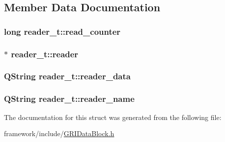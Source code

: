 \subsection{\-Member \-Data \-Documentation}
\hypertarget{structreader__t_a8c3485927676e8777fa189468d4e4744}{
\subsubsection[{read\-\_\-counter}]{\setlength{\rightskip}{0pt plus 5cm}long {\bf reader\-\_\-t\-::read\-\_\-counter}}}\label{structreader__t_a8c3485927676e8777fa189468d4e4744}
\hypertarget{structreader__t_aa62b3e0e8c6abef0b0b397abbe073192}{
\subsubsection[{reader}]{$\ast$ {\bf reader\-\_\-t\-::reader}}}\label{structreader__t_aa62b3e0e8c6abef0b0b397abbe073192}
\hypertarget{structreader__t_a703118e9269c61384e523c7c4fa89303}{
\subsubsection[{reader\-\_\-data}]{\setlength{\rightskip}{0pt plus 5cm}\-Q\-String {\bf reader\-\_\-t\-::reader\-\_\-data}}}\label{structreader__t_a703118e9269c61384e523c7c4fa89303}
\hypertarget{structreader__t_a16d6d71e8e9b9f8c61a1403d126232be}{
\subsubsection[{reader\-\_\-name}]{\setlength{\rightskip}{0pt plus 5cm}\-Q\-String {\bf reader\-\_\-t\-::reader\-\_\-name}}}\label{structreader__t_a16d6d71e8e9b9f8c61a1403d126232be}


\-The documentation for this struct was generated from the following file\-:\begin{DoxyCompactItemize}
\item 
framework/include/\hyperlink{GRIDataBlock_8h}{\-G\-R\-I\-Data\-Block.\-h}\end{DoxyCompactItemize}
